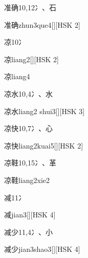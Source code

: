 \begin{entry}{准确}{10,12}{⼎、⽯}
  \begin{phonetics}{准确}{zhun3que4}[][HSK 2]
  \end{phonetics}
\end{entry}

\begin{entry}{凉}{10}{⼎}
  \begin{phonetics}{凉}{liang2}[][HSK 2]
  \end{phonetics}
  \begin{phonetics}{凉}{liang4}
  \end{phonetics}
\end{entry}

\begin{entry}{凉水}{10,4}{⼎、⽔}
  \begin{phonetics}{凉水}{liang2 shui3}[][HSK 3]
  \end{phonetics}
\end{entry}

\begin{entry}{凉快}{10,7}{⼎、⼼}
  \begin{phonetics}{凉快}{liang2kuai5}[][HSK 2]
  \end{phonetics}
\end{entry}

\begin{entry}{凉鞋}{10,15}{⼎、⾰}
  \begin{phonetics}{凉鞋}{liang2xie2}
  \end{phonetics}
\end{entry}

\begin{entry}{减}{11}{⼎}
  \begin{phonetics}{减}{jian3}[][HSK 4]
  \end{phonetics}
\end{entry}

\begin{entry}{减少}{11,4}{⼎、⼩}
  \begin{phonetics}{减少}{jian3shao3}[][HSK 4]
  \end{phonetics}
\end{entry}

